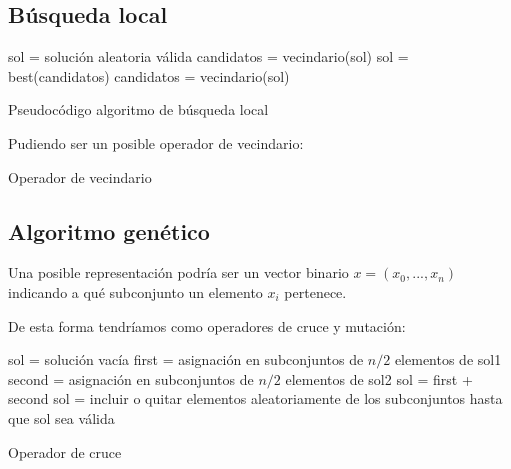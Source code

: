 \documentclass[13pt,a4paper]{article}
\begin{document}
\newpage

\subsection{Búsqueda local}

\begin{algorithm}[H]
    \SetAlgoLined
        sol = solución aleatoria válida \;
        candidatos = vecindario(sol) \;
         {
            sol = best(candidatos) \;
            candidatos = vecindario(sol) \;
        }        
    \caption{Pseudocódigo algoritmo de búsqueda local}
\end{algorithm}

\vspace{\baselineskip}

Pudiendo ser un posible operador de vecindario:

\begin{algorithm}[H]
    \SetAlgoLined
    \caption{Operador de vecindario}
\end{algorithm}


\subsection{Algoritmo genético}

Una posible representación podría ser un vector binario $x = (x_{0}, ..., x_{n})$ indicando a qué subconjunto un elemento $x_{i}$ pertenece.

\vspace{\baselineskip}

De esta forma tendríamos como operadores de cruce y mutación:

\begin{algorithm}[H]
    \SetAlgoLined
        sol = solución vacía \;
        first = asignación en subconjuntos de $n/2$ elementos de sol1 \;
        second = asignación en subconjuntos de $n/2$ elementos de sol2 \;
        sol = first + second \;
        sol = incluir o quitar elementos aleatoriamente de los subconjuntos hasta que sol sea válida \;
    \caption{Operador de cruce}
\end{algorithm}
\end{document}

